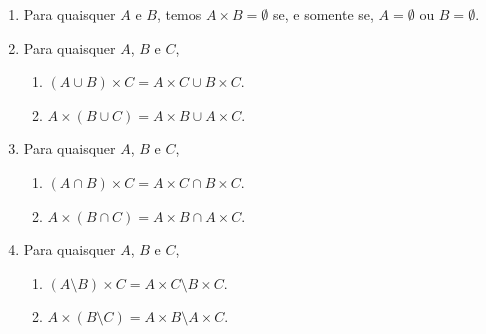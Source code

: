 \begin{proposition}
    \leavevmode
        \begin{enumerate}[leftmargin=*, align=left, label=\textbf{(\alph*)}]
            \item Para quaisquer $A$ e $B$, temos $A \times B = \emptyset$ se, e somente se, $A = \emptyset$ ou $B = \emptyset$.
            \item Para quaisquer $A$, $B$ e $C$,
                \begin{enumerate}[label=\roman*.]
                    \item $(A \cup B) \times C = A \times C \cup B \times C$.
                    \item $A \times (B \cup C) = A \times B \cup A \times C$.
                \end{enumerate}
            \item Para quaisquer $A$, $B$ e $C$,
                \begin{enumerate}[label=\roman*.]
                    \item $(A \cap B) \times C = A \times C \cap B \times C$.
                    \item $A \times (B \cap C) = A \times B \cap A \times C$.
                \end{enumerate}
            \item Para quaisquer $A$, $B$ e $C$,
                \begin{enumerate}[label=\roman*.]
                    \item $(A \setminus B) \times C = A \times C \setminus B \times C$.
                    \item $A \times (B \setminus C) = A \times B \setminus A \times C$.
                \end{enumerate}
        \end{enumerate}
\end{proposition}

